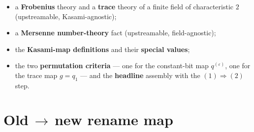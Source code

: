 \documentclass[11pt]{article}
\theoremstyle{definition}
\begin{document}
\begin{itemize}[leftmargin=1.4em,itemsep=2pt]
\item a \textbf{Frobenius} theory and a \textbf{trace} theory of a finite
      field of characteristic $2$ (upstreamable, Kasami-agnostic);
\item a \textbf{Mersenne number-theory} fact (upstreamable, field-agnostic);
\item the \textbf{Kasami-map definitions} and their \textbf{special values};
\item the two \textbf{permutation criteria} --- one for the constant-bit map
      $q^{(\varepsilon)}$, one for the trace map $g=q_1$ --- and the
      \textbf{headline} assembly with the $(1)\Rightarrow(2)$ step.
\end{itemize}

\section{Old\,$\to$\,new rename map}
\end{document}
